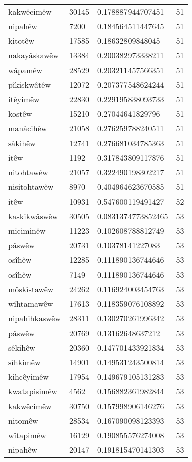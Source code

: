 \begin{longtable}{llll}
kakwêcimêw & 30145 & 0.178887944707451 & 51\\
nipahêw & 7200 & 0.184564511447645 & 51\\
kitotêw & 17585 & 0.18632809848045 & 51\\
nakayâskawêw & 13384 & 0.200382973338211 & 51\\
wâpamêw & 28529 & 0.203211457566351 & 51\\
pîkiskwâtêw & 12072 & 0.207377548624244 & 51\\
itêyimêw & 22830 & 0.229195838093733 & 51\\
kostêw & 15210 & 0.27044641829796 & 51\\
manâcihêw & 21058 & 0.276259788240511 & 51\\
sâkihêw & 12741 & 0.276681034785363 & 51\\
itêw & 1192 & 0.317843809117876 & 51\\
nitohtawêw & 21057 & 0.322490198302217 & 51\\
nisitohtawêw & 8970 & 0.404964623670585 & 51\\
itêw & 10931 & 0.547600119491427 & 52\\
kaskikwâswêw & 30505 & 0.0831374773852465 & 53\\
miciminêw & 11223 & 0.102608788812749 & 53\\
pâswêw & 20731 & 0.10378141227083 & 53\\
osîhêw & 12285 & 0.111890136744646 & 53\\
osîhêw & 7149 & 0.111890136744646 & 53\\
môskîstawêw & 24262 & 0.116924003454763 & 53\\
wîhtamawêw & 17613 & 0.118359076108892 & 53\\
nipahihkaswêw & 28311 & 0.130270261996342 & 53\\
pâswêw & 20769 & 0.13162648637212 & 53\\
sêkihêw & 20360 & 0.147701433921834 & 53\\
sîhkimêw & 14901 & 0.149531243500814 & 53\\
kihcêyimêw & 17954 & 0.149679105131283 & 53\\
kwatapisimêw & 4562 & 0.156882361982844 & 53\\
kakwêcimêw & 30750 & 0.157998906146276 & 53\\
nitomêw & 28534 & 0.167090098123393 & 53\\
wîtapimêw & 16129 & 0.190855576274008 & 53\\
nipahêw & 20147 & 0.191815470141303 & 53\\

\end{longtable}
